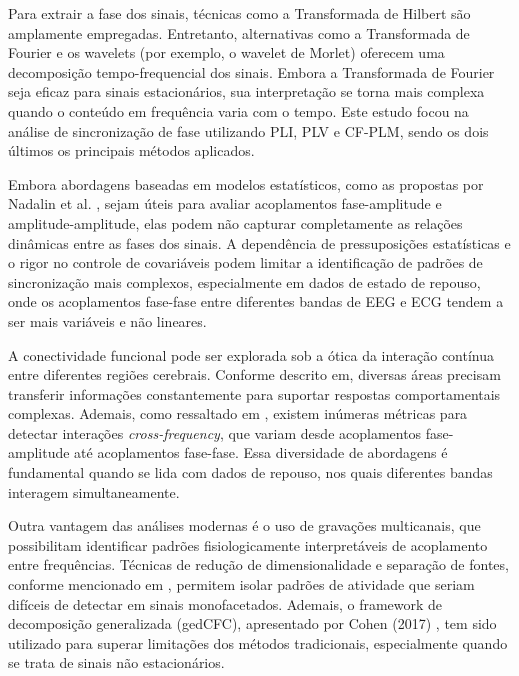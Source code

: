 Para extrair a fase dos sinais, técnicas como a Transformada de Hilbert são amplamente empregadas. Entretanto, alternativas como a Transformada de Fourier e os wavelets (por exemplo, o wavelet de Morlet) oferecem uma decomposição tempo-frequencial dos sinais. Embora a Transformada de Fourier seja eficaz para sinais estacionários, sua interpretação se torna mais complexa quando o conteúdo em frequência varia com o tempo\textsuperscript{\cite{singh2024evaluating}}. Este estudo focou na análise de sincronização de fase utilizando PLI, PLV e CF-PLM, sendo os dois últimos os principais métodos aplicados.

Embora abordagens baseadas em modelos estatísticos, como as propostas por Nadalin et al. \cite{nadalin2019statistical}, sejam úteis para avaliar acoplamentos fase-amplitude e amplitude-amplitude, elas podem não capturar completamente as relações dinâmicas entre as fases dos sinais. A dependência de pressuposições estatísticas e o rigor no controle de covariáveis podem limitar a identificação de padrões de sincronização mais complexos, especialmente em dados de estado de repouso, onde os acoplamentos fase-fase entre diferentes bandas de EEG e ECG tendem a ser mais variáveis e não lineares.

A conectividade funcional pode ser explorada sob a ótica da interação contínua entre diferentes regiões cerebrais. Conforme descrito em\textsuperscript{\cite{sorrentino2022detection}}, diversas áreas precisam transferir informações constantemente para suportar respostas comportamentais complexas. Ademais, como ressaltado em \cite{sorrentino2022detection}, existem inúmeras métricas para detectar interações \textit{cross-frequency}, que variam desde acoplamentos fase-amplitude até acoplamentos fase-fase. Essa diversidade de abordagens é fundamental quando se lida com dados de repouso, nos quais diferentes bandas interagem simultaneamente.

Outra vantagem das análises modernas é o uso de gravações multicanais, que possibilitam identificar padrões fisiologicamente interpretáveis de acoplamento entre frequências. Técnicas de redução de dimensionalidade e separação de fontes, conforme mencionado em \cite{cohen2017multivariate}, permitem isolar padrões de atividade que seriam difíceis de detectar em sinais monofacetados. Ademais, o framework de decomposição generalizada (gedCFC), apresentado por Cohen (2017) \cite{cohen2017multivariate}, tem sido utilizado para superar limitações dos métodos tradicionais, especialmente quando se trata de sinais não estacionários.

